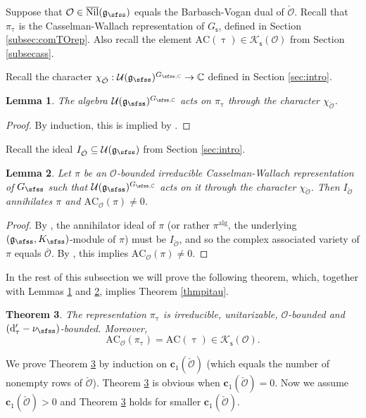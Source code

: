 \documentclass[11pt,a4paper]{amsart}
\newcommand{\CK}{{\mathcal {K}}}
\newcommand{\CO}{{\mathcal {O}}}
\newcommand{\CU}{{\mathcal {U}}}
\newcommand{\g}{\mathfrak g}
\numberwithin{equation}{section}
\newtheorem{thm}{Theorem}[section]
\newtheorem{lem}[thm]{Lemma}
\theoremstyle{remark}
\def\subset{\subseteq}
\def\Nil{\overline{\mathrm{Nil}}}
\begin{document}
Suppose that $\CO\in \Nil(\g_\sfss)$ equals the Barbasch-Vogan dual of $\check \CO$.   Recall that $\pi_\uptau$ is the Casselman-Wallach representation of $G_{\mathsf s}$, defined in Section \ref{subsec:comTOrep}.
Also recall the element $\mathrm{AC}(\uptau)\in \CK_{\mathsf s}(\CO)$ from Section \ref{subsecass}.

Recall the character $\chi_{\check \CO}: \CU(\g_\sfss)^{G_{\sfss, \C}}\rightarrow \C$  defined in Section \ref{sec:intro}.
\begin{lem}\label{inf1}
The algebra $\CU(\g_\sfss)^{G_{\sfss, \C}}$ acts on $\pi_\uptau$ through the character $\chi_{\check \CO}$.%
\end{lem}
\begin{proof}
By induction, this is implied by \cite[Theorem
1.19]{PrzInf}.
\end{proof}



Recall the ideal $I_{\check \CO}\subset \mathcal U(\g_\sfss)$ from Section \ref{sec:intro}.
\begin{lem}\label{inf2}
Let $\pi$ be an $\CO$-bounded irreducible Casselman-Wallach representation of $G_{\sfss}$ such that $\mathcal U(\g_\sfss)^{G_{\sfss, \C}}$ acts on it  through the character $\chi_{\check \CO}$. Then $I_{\check \CO}$ annihilates $\pi$ and $\mathrm{AC}_{\CO}(\pi)\neq 0$.   
\end{lem}

\begin{proof}
By \cite[Korollar 3.6]{BK}, the annihilator ideal of $\pi$ (or rather $\pi^{\mathrm{alg}}$, the  underlying $(\g_\sfss, K_\sfss)$-module of $\pi$) must be $I_{\check \CO}$, and so the complex associated variety of $\pi$ equals $\overline \CO$. By \cite[Theorem 8.4]{Vo89}, this implies $\mathrm{AC}_{\CO}(\pi)\neq 0$. 
\end{proof}


In the rest of this subsection we will prove the following theorem, which, together with Lemmas \ref{inf1} and \ref{inf2},  implies  Theorem \ref{thmpitau}.
\begin{thm}\label{thmpitau222}
The representation $\pi_\uptau$ is irreducible, unitarizable, $\CO$-bounded and $( \mathrm d'_\tau-\nu_{\sfss})$-bounded.     Moreover,
\[
\mathrm{AC}_\CO(\pi_\uptau)=\mathrm{AC}(\uptau)\in \CK_{\mathsf s}(\CO).
\]
\end{thm}

We prove Theorem \ref{thmpitau222} by induction on $\mathbf c_1(\check \CO)$ (which equals the number of nonempty rows of $\check \CO$).  Theorem \ref{thmpitau222} is obvious when $\mathbf c_1(\check \CO)=0$. Now we assume $\mathbf c_1(\check \CO)>0$ and Theorem \ref{thmpitau222} holds for  smaller $\mathbf c_1(\check \CO)$.
\end{document}
